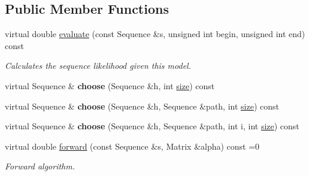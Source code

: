 \subsection*{Public Member Functions}
\begin{DoxyCompactItemize}
\item 
\mbox{\label{classtops_1_1DecodableModel_aadafde2e7cb86a3d3f261b470e91fbf3}} 
virtual double \hyperlink{classtops_1_1DecodableModel_aadafde2e7cb86a3d3f261b470e91fbf3}{evaluate} (const Sequence \&s, unsigned int begin, unsigned int end) const
\begin{DoxyCompactList}\small\item\em Calculates the sequence likelihood given this model. \end{DoxyCompactList}\item 
\mbox{\label{classtops_1_1DecodableModel_a32ae61a80b1ed6f9f5517b0c791b0d0d}} 
virtual Sequence \& {\bfseries choose} (Sequence \&h, int \hyperlink{classtops_1_1ProbabilisticModel_a4e3910e9b9b848b7078e7101909ae82a}{size}) const
\item 
\mbox{\label{classtops_1_1DecodableModel_a092776d577c0acec332066dcd88e6ee7}} 
virtual Sequence \& {\bfseries choose} (Sequence \&h, Sequence \&path, int \hyperlink{classtops_1_1ProbabilisticModel_a4e3910e9b9b848b7078e7101909ae82a}{size}) const
\item 
\mbox{\label{classtops_1_1DecodableModel_a7fec7f394ce01a543913cd7414a5dca4}} 
virtual Sequence \& {\bfseries choose} (Sequence \&h, Sequence \&path, int i, int \hyperlink{classtops_1_1ProbabilisticModel_a4e3910e9b9b848b7078e7101909ae82a}{size}) const
\item 
\mbox{\label{classtops_1_1DecodableModel_a607febee2c00a6fd0ac9582def35dbd9}} 
virtual double \hyperlink{classtops_1_1DecodableModel_a607febee2c00a6fd0ac9582def35dbd9}{forward} (const Sequence \&s, Matrix \&alpha) const =0
\begin{DoxyCompactList}\small\item\em Forward algorithm. \end{DoxyCompactList}\item 
\mbox{\label{classtops_1_1DecodableModel_ae2339a90c124e65aabbb9887c04239ff}} 

\end{DoxyCompactItemize}
